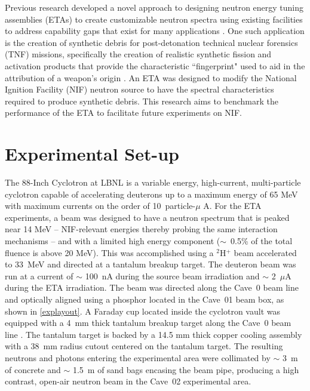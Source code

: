 \documentclass[twocolumn,10pt,final]{asme2ej}
\begin{document}
Previous research developed a novel approach to designing neutron energy tuning assemblies (ETAs) to create customizable neutron spectra using existing facilities to address capability gaps that exist for many applications \cite{Bevins2017}.  
One such application is the creation of synthetic debris for post-detonation technical nuclear forensics (TNF) missions, specifically the creation of realistic synthetic fission and activation products that provide the characteristic ``fingerprint" used to aid in the attribution of a weapon's origin  \cite{111thCongress2010, JNFWG2013}.
An ETA was designed to modify the National Ignition Facility (NIF) neutron source to have the spectral characteristics required to produce synthetic debris.
This research aims to benchmark the performance of the ETA to facilitate future experiments on NIF.  


\vspace{-0.4 cm}
\section{Experimental Set-up} \label{sec:exp-setup}
The 88-Inch Cyclotron at LBNL is a variable energy, high-current, multi-particle cyclotron capable of accelerating deuterons up to a maximum energy of 65 MeV with maximum currents on the order of 10~particle-$\mu$ A. 
For the ETA experiments, a beam was designed to have a neutron spectrum that is peaked near 14 MeV -- NIF-relevant energies thereby probing the same interaction mechanisms -- and with a limited high energy component ($\sim$~0.5\% of the total fluence is above 20 MeV).
This was accomplished using a $^2$H$^+$ beam accelerated to 33~MeV and directed at a tantalum breakup target.
The deuteron beam was run at a current of $\sim$ 100~nA during the source beam  irradiation and $\sim$ 2~$\mu$A during the ETA irradiation. 
The beam was directed along the Cave~0 beam line and optically aligned using a phosphor located in the Cave~01 beam box, as shown in \autoref{explayout}. 
A Faraday cup located inside the cyclotron vault was equipped with a 4~mm thick tantalum breakup target along the Cave~0 beam line \cite{Bleuel2007}. 
The tantalum target is backed by a 14.5 mm thick copper cooling assembly with a 38~mm radius cutout centered on the tantalum target. 
The resulting neutrons and photons entering the experimental area were collimated by $\sim$ 3~m of concrete and $\sim$ 1.5~m of sand bags encasing the beam pipe, producing a high contrast, open-air neutron beam in the Cave~02 experimental area.
\end{document}
